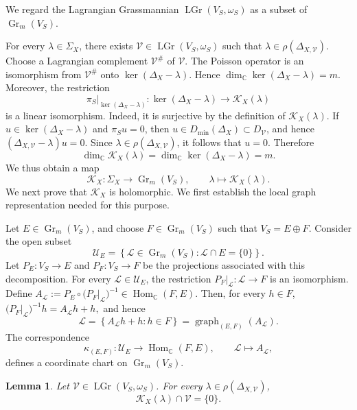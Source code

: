 \documentclass[12pt]{amsart}
\theoremstyle{plain}
\newtheorem{lem}[thm]{Lemma}
\theoremstyle{definition}
\theoremstyle{remark}
\numberwithin{equation}{section} \numberwithin{figure}{section}
\renewcommand*{\to}{\rightarrow}
\newcommand{\mb}[1]{\mathbb{#1}} %
\newcommand{\mc}[1]{\mathcal{#1}}
\begin{document}
We regard the Lagrangian Grassmannian
\(\operatorname{LGr}(V_S,\omega_S)\) as a subset of
\(\operatorname{Gr}_m(V_S)\).

For every \(\lambda\in\Sigma_X\), there exists
\(\mc V\in\operatorname{LGr}(V_S,\omega_S)\) such that
\(\lambda\in\rho(\Delta_{X,\mc V})\). Choose a Lagrangian complement
\(\mc V^\#\) of \(\mc V\). The Poisson operator is an isomorphism
from \(\mc V^\#\) onto \(\ker(\Delta_X-\lambda)\). Hence
\(\dim_{\mb C}\ker(\Delta_X-\lambda)=m\).
Moreover, the restriction
\[
    \pi_S\big|_{\ker(\Delta_X-\lambda)}:
    \ker(\Delta_X-\lambda)
    \longrightarrow
    \mc K_X(\lambda)
\]
is a linear isomorphism. Indeed, it is surjective by the definition of
\(\mc K_X(\lambda)\). If
\(u\in\ker(\Delta_X-\lambda)\) and \(\pi_Su=0\), then
\(u\in D_{\min}(\Delta_X)\subset D_{\mc V}\), and hence
\(
    (\Delta_{X,\mc V}-\lambda)u=0.
\)
Since \(\lambda\in\rho(\Delta_{X,\mc V})\), it follows that \(u=0\).
Therefore
\[
    \dim_{\mb C}\mc K_X(\lambda)
    =
    \dim_{\mb C}\ker(\Delta_X-\lambda)
    =
    m.
\]
We thus obtain a map
\[
    \mc K_X:
    \Sigma_X
    \longrightarrow
    \operatorname{Gr}_m(V_S),
    \qquad
    \lambda
    \longmapsto
    \mc K_X(\lambda).
\]
We next prove that \(\mc K_X\) is holomorphic. We first establish the
local graph representation needed for this purpose.


Let \(E\in\operatorname{Gr}_m(V_S)\), and choose
\(F\in\operatorname{Gr}_m(V_S)\) such that
\(V_S=E\oplus F\). Consider the open subset
\[
    \mc U_E
    =
    \left\{
        \mc L\in\operatorname{Gr}_m(V_S):
        \mc L\cap E=\{0\}
    \right\}.
\]
Let \(P_E:V_S\to E\) and \(P_F:V_S\to F\) be the projections
associated with this decomposition.
For every \(\mc L\in\mc U_E\), the restriction
\(P_F|_{\mc L}:\mc L\to F\) is an isomorphism. Define
\(
    A_{\mc L}
    :=
    P_E\circ
    \bigl(P_F|_{\mc L}\bigr)^{-1}
    \in
    \operatorname{Hom}_{\mb C}(F,E).
\)
Then, for every \(h\in F\),
\(
    \bigl(P_F|_{\mc L}\bigr)^{-1}h
    =
    A_{\mc L}h+h,
\)
and hence
\[
    \mc L
    =
    \left\{
        A_{\mc L}h+h:
        h\in F
    \right\}
    =
    \operatorname{graph}_{(E,F)}(A_{\mc L}).
\]
The correspondence
\[
    \kappa_{(E,F)}:
    \mc U_E
    \longrightarrow
    \operatorname{Hom}_{\mb C}(F,E),
    \qquad
    \mc L
    \longmapsto
    A_{\mc L},
\]
defines a coordinate chart on
\(\operatorname{Gr}_m(V_S)\).

\begin{lem}\label{lem:cauchy-data-transverse}
Let \(\mc V\in\operatorname{LGr}(V_S,\omega_S)\). For every
\(\lambda\in\rho(\Delta_{X,\mc V})\),
\[
    \mc K_X(\lambda)\cap\mc V=\{0\}.
\]
\end{lem}
\end{document}
